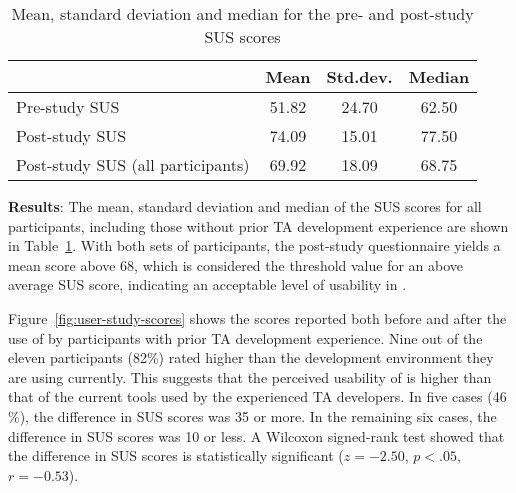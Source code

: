 \documentclass[10pt,conference,letterpaper]{IEEEtran}
\newcommand{\opentee}{\protect{TEE-Vi}\xspace}
\newcommand{\opentee}{\protect{Open-TEE}\xspace}
\begin{document}
\begin{table}
\centering
\caption{Mean, standard deviation and median for the pre- and post-study SUS scores}
\label{tbl:user-study-scores}
\begin{tabular}{l c c c}
  & Mean & Std.dev. & Median \\
  \hline
  Pre-study SUS & 51.82 & 24.70 & 62.50 \\
  \rowcolor{black!15} \cellcolor{black!15}Post-study SUS & 74.09 &
  15.01 & 77.50 \\
  Post-study SUS \tiny(all participants) & 69.92 & 18.09 & 68.75 \\
  \hline
\end{tabular}
\end{table}

\noindent\textbf{Results}: 
The mean, standard deviation and median of the SUS scores for all
participants, including those without prior TA development experience
are shown in Table~\ref{tbl:user-study-scores}. With both sets of
participants, the post-study questionnaire yields a mean score above
68, which is considered the threshold value for an above average SUS
score, indicating an acceptable level of usability in \opentee.

Figure~\ref{fig:user-study-scores} shows the scores reported both
before and after the use of \opentee by participants with prior TA
development experience. Nine out of the eleven participants (82\%) rated
\opentee higher than the development environment they are using
currently. This suggests that the perceived usability of \opentee is
higher than that of the current tools used by the experienced TA
developers. In five cases (46 \%), the difference in SUS scores was 35
or more. In the remaining six cases, the difference in SUS scores was
10 or less. A Wilcoxon signed-rank test showed that the difference in
SUS scores is statistically significant ($z=-2.50$, $p<.05$, $r=-0.53$).
\end{document}
